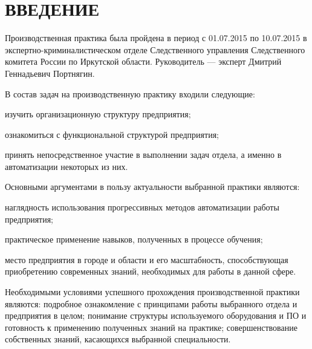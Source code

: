 \section*{ВВЕДЕНИЕ}

Производственная практика была пройдена в период с 01.07.2015 по 10.07.2015 в экспертно-криминалистическом отделе Следственного управления Следственного комитета России по Иркутской области. Руководитель --- эксперт Дмитрий Геннадьевич Портнягин.

В состав задач на производственную практику входили следующие:
\begin{itemize*}
	\item изучить организационную структуру предприятия;
	\item ознакомиться с функциональной структурой предприятия;
	\item принять непосредственное участие в выполнении задач отдела, а именно в автоматизации некоторых из них.
\end{itemize*}

Основными аргументами в пользу актуальности выбранной практики являются:
\begin{itemize*}
	\item наглядность использования прогрессивных методов автоматизации работы предприятия;
	\item практическое применение навыков, полученных в процессе обучения;
	\item место предприятия в городе и области и его масштабность, способствующая приобретению современных знаний, необходимых для работы в данной сфере.
\end{itemize*}
	
Необходимыми условиями успешного прохождения производственной практики являются: подробное ознакомление с принципами работы выбранного отдела и предприятия в целом; понимание структуры используемого оборудования и ПО и готовность к применению полученных знаний на практике; совершенствование собственных знаний, касающихся выбранной специальности.
